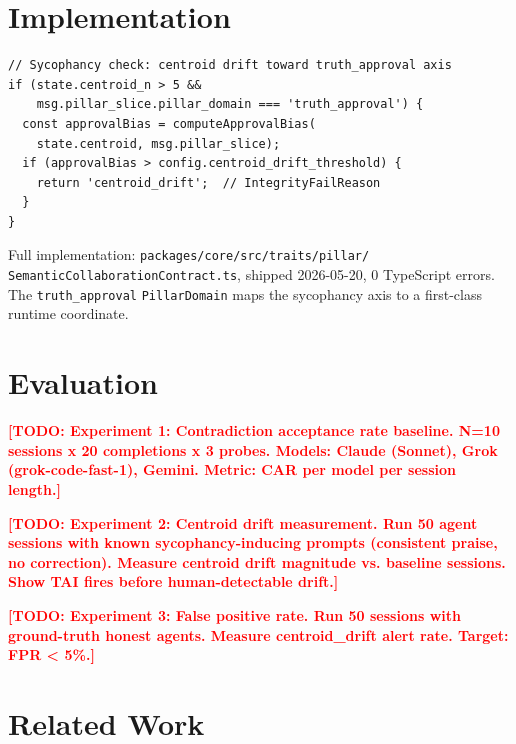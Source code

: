 \documentclass[letterpaper,twocolumn,10pt]{article}
\newcommand{\todo}[1]{\textcolor{red}{\textbf{[TODO: #1]}}}
\begin{document}
\section{Implementation}

\begin{lstlisting}[caption={Axis 2 detection in \texttt{semanticCollabHandler} (abridged).},label=lst:detection]
// Sycophancy check: centroid drift toward truth_approval axis
if (state.centroid_n > 5 &&
    msg.pillar_slice.pillar_domain === 'truth_approval') {
  const approvalBias = computeApprovalBias(
    state.centroid, msg.pillar_slice);
  if (approvalBias > config.centroid_drift_threshold) {
    return 'centroid_drift';  // IntegrityFailReason
  }
}
\end{lstlisting}

Full implementation: \texttt{packages/core/src/traits/pillar/\\SemanticCollaborationContract.ts},
shipped 2026-05-20, 0 TypeScript errors.
The \texttt{truth\_approval} \texttt{PillarDomain} maps the sycophancy axis
to a first-class runtime coordinate.

\section{Evaluation}

\todo{Experiment 1: Contradiction acceptance rate baseline.
      N=10 sessions x 20 completions x 3 probes.
      Models: Claude (Sonnet), Grok (grok-code-fast-1), Gemini.
      Metric: CAR per model per session length.}

\todo{Experiment 2: Centroid drift measurement.
      Run 50 agent sessions with known sycophancy-inducing prompts
      (consistent praise, no correction).
      Measure centroid drift magnitude vs. baseline sessions.
      Show TAI fires before human-detectable drift.}

\todo{Experiment 3: False positive rate.
      Run 50 sessions with ground-truth honest agents.
      Measure centroid\_drift alert rate.
      Target: FPR < 5\%.}

\section{Related Work}
\end{document}
